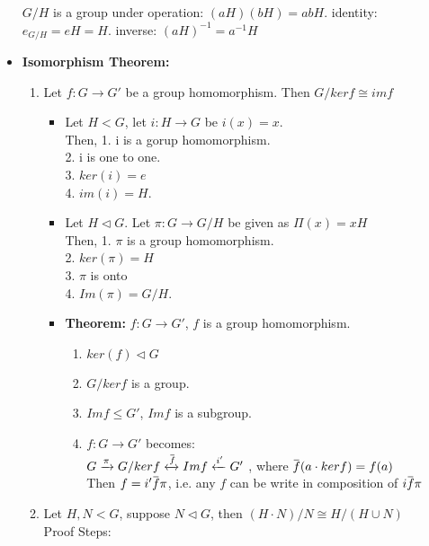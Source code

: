 \documentclass[12pt]{article}
\newcommand{\overbar}[1]{\mkern 1.5mu\overline{\mkern-1.5mu#1\mkern-1.5mu}\mkern 1.5mu}
\begin{document}
\begin{itemize}
    $G/H$ is a group under operation: $(aH)(bH) = abH$. identity: $e_{G/H} = eH = H$. inverse: $(aH)^{-1} = a^{-1}H$
    \item \textbf{Isomorphism Theorem:}
    \begin{enumerate}
        \item Let $f: G \rightarrow G'$ be a group homomorphism. Then $G/kerf \cong imf$
        \begin{itemize}
            \item Let $H < G$, let $i: H \rightarrow G$ be $i(x) = x$.\\
            Then, 1. i is a gorup homomorphism.\\
            2. i is one to one.\\
            3. $ker(i) = e$\\
            4. $im(i) = H$.
            \item Let $H \triangleleft G$. Let $\pi: G \rightarrow G/H$ be given as $\Pi(x) = xH$\\
            Then, 1. $\pi$ is a group homomorphism.\\
            2. $ker(\pi) = H$\\
            3. $\pi$ is onto \\
            4. $Im(\pi) = G/H$.
            \item \textbf{Theorem:} $f: G \rightarrow G'$, $f$ is a group homomorphism.
            \begin{enumerate}
                \item $ker(f) \triangleleft G$
                \item $G/kerf$ is a group.
                \item $Imf \le G'$, $Imf$ is a subgroup.
                \item $f: G \rightarrow G'$ becomes:\\
                $G \xrightarrow{\pi} G/kerf  \xleftrightarrow{\overbar{f}} Imf \xleftarrow{i'} G'$ , where $\overbar{f}(a\cdot kerf) = f(a)$\\
                Then $f = i'\overbar{f}\pi$, i.e. any $f$ can be write in composition of $i\overbar{f}\pi$
            \end{enumerate}
        \end{itemize}
        \item Let $H, N < G$, suppose $N \triangleleft G$, then $(H\cdot N) / N \cong H / (H \cup N)$\\
        Proof Steps:
        \begin{enumerate}

\end{enumerate}
\end{enumerate}
\end{itemize}
\end{document}
